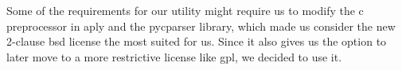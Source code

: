 \noindent Some of the requirements for our \gls{utility} might require us to modify
the \Gls{c} \gls{preprocessor} in \Gls{aply} and the \gls{pycparser} \gls{library}, which made us consider
the new 2-clause \Gls{bsd} license the most suited for us. Since it also gives us the
option to later move to a more restrictive license like \Gls{gpl}, we decided to use
it.

